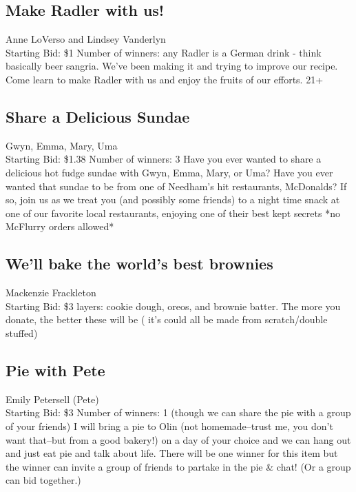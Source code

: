 \documentclass[11pt]{article}
\begin{document}
\subsection{Make Radler with us!}
Anne LoVerso and Lindsey Vanderlyn
\\
Starting Bid: \$1
\newline
Number of winners: any
\newline
Radler is a German drink - think basically beer sangria.  We've been making it and trying to improve our recipe.  Come learn to make Radler with us and enjoy the fruits of our efforts. 21+
\subsection{Share a Delicious Sundae}
Gwyn, Emma, Mary, Uma
\\
Starting Bid: \$1.38
\newline
Number of winners: 3
\newline
Have you ever wanted to share a delicious hot fudge sundae with Gwyn, Emma, Mary, or Uma? Have you ever wanted that sundae to be from one of Needham's hit restaurants, McDonalds? If so, join us as we treat you (and possibly some friends) to a night time snack at one of our favorite local restaurants, enjoying one of their best kept secrets *no McFlurry orders allowed*
\subsection{We'll bake the world's best brownies }
Mackenzie Frackleton
\\
Starting Bid: \$3
 layers: cookie dough, oreos, and brownie batter. The more you donate, the better these will be ( it's could all be made from scratch/double stuffed)
\subsection{Pie with Pete}
Emily Petersell (Pete)
\\
Starting Bid: \$3
\newline
Number of winners: 1 (though we can share the pie with a group of your friends)
\newline
I will bring a pie to Olin (not homemade--trust me, you don't want that--but from a good bakery!) on a day of your choice and we can hang out and just eat pie and talk about life. There will be one winner for this item but the winner can invite a group of friends to partake in the pie \& chat! (Or a group can bid together.)
\end{document}
